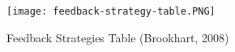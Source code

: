 \begin{comment}
    & \begin{itemize}
        \item Oral
        \item Written
        \item Visual Demonstration
        \end{itemize}
    & \begin{itemize}
        \item Select the best mode for the message Would a comment in passing the student's desk suffice? Is a conference needed?
        \item Interactive feedback (talking with the student) is best when possible.
        \item Give written feedback on written work or on assignment cover sheets.
        \item Use demonstration if "how to do something" is an issue or if the student needs example.
        \end{itemize}
        \\ \hline
    Audience
    & \begin{itemize}
        \item Individual
        \item Group/class
        \end{itemize}
    & \begin{itemize}
        \item Individual feedback says, "The teacher values my learning."
        \item Group/class feedback works if most of the class missed the same concept on an assignment, which presents an opportunity for reteaching.
        \end{itemize}
        \\ \hline
\end{tabular}
\label{tab:feedback-strategy-table}
\end{table}
\end{comment}

\begin{figure}[ht]
    \centering
    \texttt{[image: feedback-strategy-table.PNG]}
    \caption{Feedback Strategies Table (Brookhart, 2008)}
    \label{fig:feedback-strategy-table}
\end{figure}


